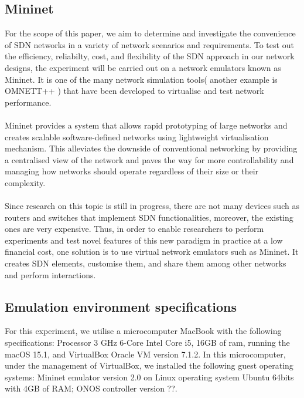 \documentclass{article}
\begin{document}
\subsection{Mininet}
For the scope of this paper, we aim to determine and investigate the convenience of SDN networks in a variety of network scenarios and requirements. To test out the efficiency, reliabilty, cost, and flexibility of the SDN approach in our network designs, the experiment will be carried out on a network emulators known as Mininet. It is one of the many network simulation tools( another example is OMNETT++ ) that have been developed to virtualise and test network performance\cite{10220519, Haji_Zeebaree_Saeed_Ameen_Shukur_Omar_Sadeeq_Ageed_Ibrahim_Yasin_2021}. \\\\ Mininet\cite{6860404} provides a system that allows rapid prototyping of large networks and creates scalable software-defined networks using lightweight virtualisation mechanism. This alleviates the downside of conventional networking by providing a centralised view of the network and paves the way for more controllability and managing how networks should operate regardless of their size or their complexity. \\\\
Since research on this topic is still in progress, there are not many devices such as routers and switches that implement SDN functionalities, moreover, the existing ones are very expensive. Thus, in order to enable researchers to perform experiments and test novel features of this new paradigm in practice at a low financial cost, one solution is to use virtual network emulators such as Mininet. It creates SDN elements, customise them, and share them among other networks and perform interactions\cite{6860404}.

\newpage
\subsection{Emulation environment specifications}
For this experiment, we utilise a microcomputer MacBook with the following specifications: Processor 3 GHz 6-Core Intel Core i5, 16GB of ram, running the macOS 15.1, and VirtualBox Oracle VM version 7.1.2.
In this microcomputer, under the management of VirtualBox, we installed the following guest operating systems: Mininet emulator version 2.0 on Linux operating system Ubuntu 64bits with 4GB of RAM; ONOS controller version ??.
\end{document}

